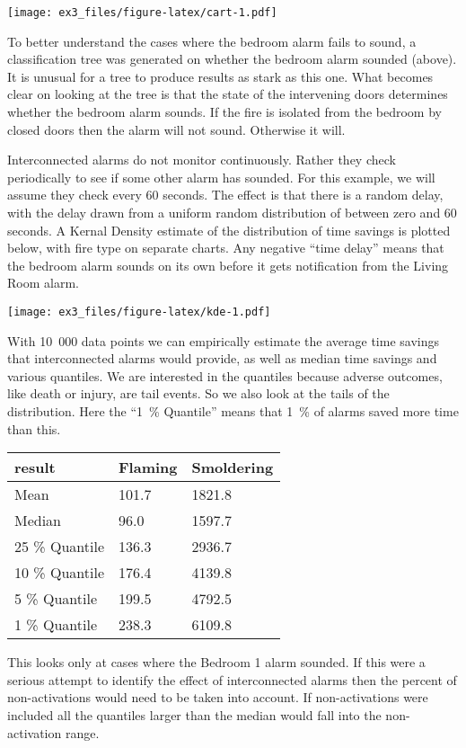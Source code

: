 \documentclass[
]{article}
\begin{document}
\texttt{[image: ex3\_files/figure-latex/cart-1.pdf]}

To better understand the cases where the bedroom alarm fails to sound, a
classification tree was generated on whether the bedroom alarm sounded
(above). It is unusual for a tree to produce results as stark as this
one. What becomes clear on looking at the tree is that the state of the
intervening doors determines whether the bedroom alarm sounds. If the
fire is isolated from the bedroom by closed doors then the alarm will
not sound. Otherwise it will.

Interconnected alarms do not monitor continuously. Rather they check
periodically to see if some other alarm has sounded. For this example,
we will assume they check every 60 seconds. The effect is that there is
a random delay, with the delay drawn from a uniform random distribution
of between zero and 60 seconds. A Kernal Density estimate of the
distribution of time savings is plotted below, with fire type on
separate charts. Any negative ``time delay'' means that the bedroom
alarm sounds on its own before it gets notification from the Living Room
alarm.

\texttt{[image: ex3\_files/figure-latex/kde-1.pdf]}

With 10~000 data points we can empirically estimate the average time
savings that interconnected alarms would provide, as well as median time
savings and various quantiles. We are interested in the quantiles
because adverse outcomes, like death or injury, are tail events. So we
also look at the tails of the distribution. Here the ``1~\% Quantile''
means that 1~\% of alarms saved more time than this.

\begin{longtable}[]{@{}lll@{}}
\toprule
result & Flaming & Smoldering\tabularnewline
\midrule
\endhead
Mean & 101.7 & 1821.8\tabularnewline
Median & 96.0 & 1597.7\tabularnewline
25 \% Quantile & 136.3 & 2936.7\tabularnewline
10 \% Quantile & 176.4 & 4139.8\tabularnewline
5 \% Quantile & 199.5 & 4792.5\tabularnewline
1 \% Quantile & 238.3 & 6109.8\tabularnewline
\bottomrule
\end{longtable}

This looks only at cases where the Bedroom 1 alarm sounded. If this were
a serious attempt to identify the effect of interconnected alarms then
the percent of non-activations would need to be taken into account. If
non-activations were included all the quantiles larger than the median
would fall into the non-activation range.
\end{document}
